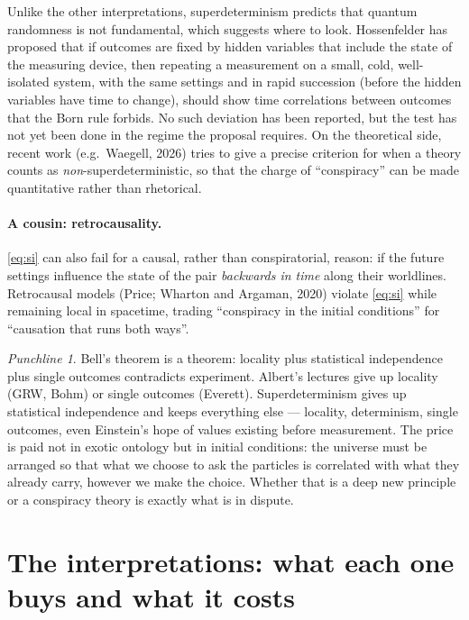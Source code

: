 \documentclass[11pt,a4paper]{article}
\theoremstyle{remark}
\newtheorem*{punchline}{Punchline}
\begin{document}
Unlike the other interpretations, superdeterminism predicts that quantum
randomness is not fundamental, which suggests where to look. Hossenfelder has
proposed that if outcomes are fixed by hidden variables that include the state of
the measuring device, then repeating a measurement on a small, cold,
well-isolated system, with the same settings and in rapid succession (before the
hidden variables have time to change), should show time correlations between
outcomes that the Born rule forbids. No such deviation has been reported, but the
test has not yet been done in the regime the proposal requires. On the
theoretical side, recent work (e.g.\ Waegell, 2026) tries to give a precise
criterion for when a theory counts as \emph{non}-superdeterministic, so that the
charge of ``conspiracy'' can be made quantitative rather than rhetorical.

\paragraph{A cousin: retrocausality.} \eqref{eq:si} can also fail for a
causal, rather than conspiratorial, reason: if the future settings influence the
state of the pair \emph{backwards in time} along their worldlines. Retrocausal
models (Price; Wharton and Argaman, 2020) violate \eqref{eq:si} while remaining
local in spacetime, trading ``conspiracy in the initial conditions'' for
``causation that runs both ways''.

\begin{punchline}
Bell's theorem is a theorem: locality plus statistical independence plus single
outcomes contradicts experiment. Albert's lectures give up locality (GRW, Bohm)
or single outcomes (Everett). Superdeterminism gives up statistical independence
and keeps everything else --- locality, determinism, single outcomes, even
Einstein's hope of values existing before measurement. The price is paid not in
exotic ontology but in initial conditions: the universe must be arranged so that
what we choose to ask the particles is correlated with what they already carry,
however we make the choice. Whether that is a deep new principle or a
conspiracy theory is exactly what is in dispute.
\end{punchline}

\section{The interpretations: what each one buys and what it costs}\label{sec:interp}
\end{document}

